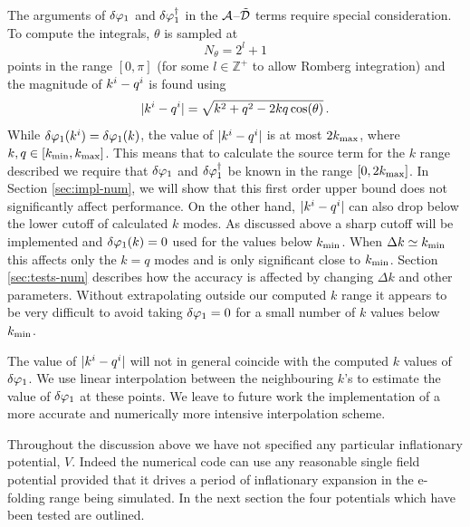 The arguments of $\delta\varphi_{1}$ and $\delta\varphi_{1}^{\dagger}$ in the $\mathcal{A}$--$\tilde{\mathcal{D}}$ terms require
special consideration. 
To compute the integrals, $\theta$ is sampled at 
% 
\begin{equation}
\label{eq:nthetadefn}
N_\theta = 2^l + 1
\end{equation}
% 
points in the range
$[0,\pi]$ (for some $l\in \mathbb{Z}^+$ to allow Romberg integration) and the
magnitude of
$k^i-q^i$
is
found using
% 
\begin{equation}
 |k^i -q^i| = \sqrt{k^2 + q^2 - 2kq\cos(\theta)}\,.
\end{equation}
%
While $\delta\varphi_{1}(k^i)=\delta\varphi_{1}(k)$, the value of $|k^i-q^i|$ is at most
$2k_{\mathrm{max}}$, where $k,q \in [k_{\mathrm{min}},k_{\mathrm{max}}]$. This means that to calculate
the source term for the $k$ range described we require that $\delta\varphi_{1}$
and $\delta\varphi_{1}^{\dagger}$ be known in the range $[0, 2k_{\mathrm{max}}]$. In
Section \ref{sec:impl-num}, we will 
show that this first order upper bound does not significantly affect
performance. On the other hand, $|k^i-q^i|$ can also drop below the
lower cutoff of calculated $k$ modes. As discussed above a sharp cutoff will be
implemented and $\delta\varphi_{1}(k)=0$ used for the values below
$k_{\mathrm{min}}$. When $\Delta k \simeq k_{\mathrm{min}}$ this affects only the $k=q$ modes and
is only significant close to $k_{\mathrm{min}}$. 
Section \ref{sec:tests-num}
describes how the accuracy is affected by changing $\Delta k$ and
other parameters. Without extrapolating outside our computed $k$ range
it appears to be very difficult to avoid taking $\delta\varphi_{1}=0$ for a small number of
$k$ values below $k_{\mathrm{min}}$.


The value of $|k^i-q^i|$ will not in general coincide with the computed $k$
values of $\delta\varphi_{1}$. We use linear interpolation between the neighbouring $k$'s to
estimate the value of $\delta\varphi_{1}$ at these points. We leave to future work the
implementation of a more
accurate and numerically more intensive interpolation scheme.


Throughout the discussion above we have not specified any particular inflationary
potential, $V$. Indeed the numerical code can use any reasonable
single field potential provided that it drives a period of inflationary expansion in
the e-folding range being simulated. In the next section the four potentials which
have been tested are outlined. 

